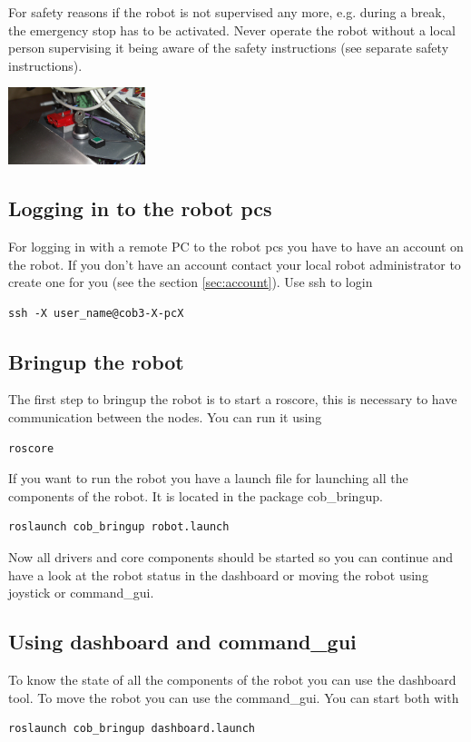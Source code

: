 For safety reasons if the robot is not supervised any more, e.g. during a break, the emergency stop has to be activated. Never operate the robot without a local person supervising it being aware of the safety instructions (see separate safety instructions).

\begin{center}
\includegraphics[width=0.3\textwidth]{images/key.png}
\end{center}


\subsection{Logging in to the robot pcs}
For logging in with a remote PC to the robot pcs you have to have an account on the robot. If you don't have an account contact your local robot administrator to create one for you (see the section \ref{sec:account}). Use ssh to login

\begin{lstlisting}
ssh -X user_name@cob3-X-pcX
\end{lstlisting}

\subsection{Bringup the robot}
The first step to bringup the robot is to start a roscore, this is necessary to have communication between the nodes. You can run it using
\begin{lstlisting}
roscore
\end{lstlisting}

If you want to run the robot you have a launch file for launching all the components of the robot. It is located in the package cob\_bringup.
\begin{lstlisting}
roslaunch cob_bringup robot.launch
\end{lstlisting}

Now all drivers and core components should be started so you can continue and have a look at the robot status in the dashboard or moving the robot using joystick or command\_gui.

\subsection{Using dashboard and command\_gui}
To know the state of all the components of the robot you can use the dashboard tool. To move the robot you can use the command\_gui. You can start both with
\begin{lstlisting}
roslaunch cob_bringup dashboard.launch
\end{lstlisting}

